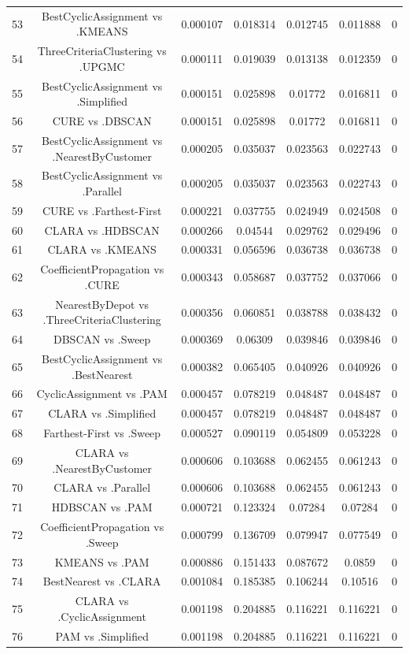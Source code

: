 \documentclass[a4paper,10pt]{article}
\begin{document}
\begin{landscape}
\begin{table}[!htp]
\begin{tabular}{ccccccc}
53&BestCyclicAssignment vs .KMEANS&0.000107&0.018314&0.012745&0.011888&0\\
54&ThreeCriteriaClustering vs .UPGMC&0.000111&0.019039&0.013138&0.012359&0\\
55&BestCyclicAssignment vs .Simplified&0.000151&0.025898&0.01772&0.016811&0\\
56&CURE vs .DBSCAN&0.000151&0.025898&0.01772&0.016811&0\\
57&BestCyclicAssignment vs .NearestByCustomer&0.000205&0.035037&0.023563&0.022743&0\\
58&BestCyclicAssignment vs .Parallel&0.000205&0.035037&0.023563&0.022743&0\\
59&CURE vs .Farthest-First&0.000221&0.037755&0.024949&0.024508&0\\
60&CLARA vs .HDBSCAN&0.000266&0.04544&0.029762&0.029496&0\\
61&CLARA vs .KMEANS&0.000331&0.056596&0.036738&0.036738&0\\
62&CoefficientPropagation vs .CURE&0.000343&0.058687&0.037752&0.037066&0\\
63&NearestByDepot vs .ThreeCriteriaClustering&0.000356&0.060851&0.038788&0.038432&0\\
64&DBSCAN vs .Sweep&0.000369&0.06309&0.039846&0.039846&0\\
65&BestCyclicAssignment vs .BestNearest&0.000382&0.065405&0.040926&0.040926&0\\
66&CyclicAssignment vs .PAM&0.000457&0.078219&0.048487&0.048487&0\\
67&CLARA vs .Simplified&0.000457&0.078219&0.048487&0.048487&0\\
68&Farthest-First vs .Sweep&0.000527&0.090119&0.054809&0.053228&0\\
69&CLARA vs .NearestByCustomer&0.000606&0.103688&0.062455&0.061243&0\\
70&CLARA vs .Parallel&0.000606&0.103688&0.062455&0.061243&0\\
71&HDBSCAN vs .PAM&0.000721&0.123324&0.07284&0.07284&0\\
72&CoefficientPropagation vs .Sweep&0.000799&0.136709&0.079947&0.077549&0\\
73&KMEANS vs .PAM&0.000886&0.151433&0.087672&0.0859&0\\
74&BestNearest vs .CLARA&0.001084&0.185385&0.106244&0.10516&0\\
75&CLARA vs .CyclicAssignment&0.001198&0.204885&0.116221&0.116221&0\\
76&PAM vs .Simplified&0.001198&0.204885&0.116221&0.116221&0\\

\end{tabular}
\end{table}
\end{landscape}
\end{document}
